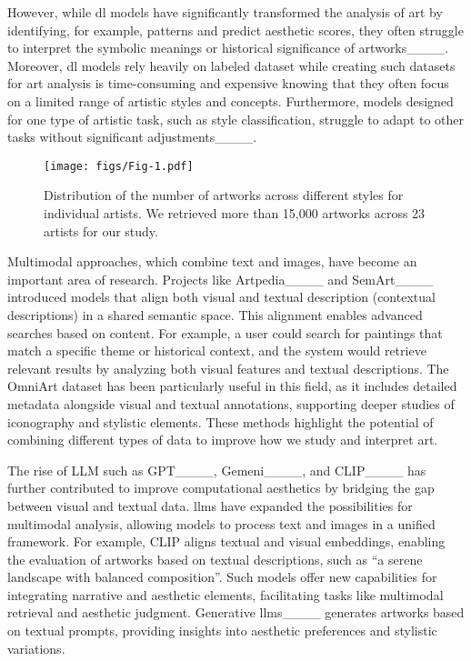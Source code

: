 However, while \gls{dl} models have significantly transformed the analysis of art by identifying, for example, patterns and predict aesthetic scores, they often struggle to interpret the symbolic meanings or historical significance of artworks____. Moreover, \gls{dl} models rely heavily on labeled dataset while creating such datasets for art analysis is time-consuming and expensive knowing that they often focus on a limited range of artistic styles and concepts. Furthermore, models designed for one type of artistic task, such as style classification, struggle to adapt to other tasks without significant adjustments____.
\begin{figure*}[!ht] %
    \centering
    \texttt{[image: figs/Fig-1.pdf]}
    \caption{Distribution of the number of artworks across different styles for individual artists. We retrieved more than 15,000 artworks across 23 artists for our study.}
    \label{fig:fig1}
\end{figure*}
Multimodal approaches, which combine text and images, have become an important area of research. Projects like Artpedia____ and SemArt____ introduced models that align both visual and textual description (contextual descriptions)  in a shared semantic space. 
This alignment enables advanced searches based on content. %
For example, a user could search for paintings that match a specific theme or historical context, and the system would retrieve relevant results by analyzing both visual features and textual descriptions. The OmniArt dataset has been particularly useful in this field, as it includes detailed metadata alongside visual and textual annotations, supporting deeper studies of iconography and stylistic elements. These methods highlight the potential of combining different types of data to improve how we study and interpret art.

The rise of LLM such as GPT____,  Gemeni____, and CLIP____ has further contributed to improve computational aesthetics by bridging the gap between visual and textual data. \glspl{llm} have expanded the possibilities for multimodal analysis, allowing models to process text and images in a unified framework. For example, CLIP aligns textual and visual embeddings, enabling the evaluation of artworks based on textual descriptions, such as ``a serene landscape with balanced composition''. Such models offer new capabilities for integrating narrative and aesthetic elements, facilitating tasks like multimodal retrieval and aesthetic judgment.  Generative \glspl{llm}____ generates artworks based on textual prompts, providing insights into aesthetic preferences and stylistic variations.

